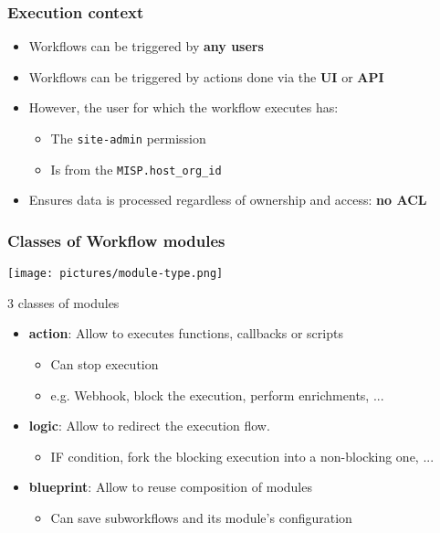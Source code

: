 \begin{frame}
    \frametitle{Execution context}
    \begin{itemize}
        \item Workflows can be triggered by \textbf{any users}
        \item Workflows can be triggered by actions done via the \textbf{UI} or \textbf{API}
        \item However, the user for which the workflow executes has:
        \begin{itemize}
            \item The \texttt{site-admin} permission
            \item Is from the \texttt{MISP.host\_org\_id}
        \end{itemize}
        \item Ensures data is processed regardless of ownership and access: \textbf{no ACL}
    \end{itemize}
\end{frame}

\begin{frame}
    \frametitle{Classes of Workflow modules}
    \begin{center}
        \texttt{[image: pictures/module-type.png]}
    \end{center}
    3 classes of modules
    \begin{itemize}
        \item \textbf{action}: Allow to executes functions, callbacks or scripts
        \begin{itemize}
            \item Can stop execution
            \item e.g. Webhook, block the execution, perform enrichments, ...
        \end{itemize}
        \item \textbf{logic}: Allow to redirect the execution flow.
        \begin{itemize}
            \item IF condition, fork the blocking execution into a non-blocking one, ...
        \end{itemize}
        \item \textbf{blueprint}: Allow to reuse composition of modules
        \begin{itemize}
            \item Can save subworkflows and its module's configuration
        \end{itemize}
    \end{itemize}
\end{frame}

